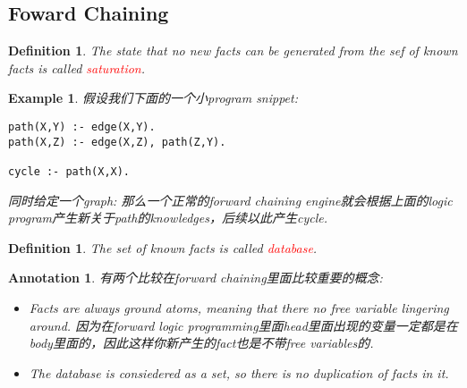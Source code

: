\documentclass{article}
\theoremstyle{plain}
\newtheorem{example}[theorem]{Example}
\newtheorem{definition}[theorem]{Definition}
\newtheorem{annotation}[theorem]{Annotation}
\theoremstyle{nonumberplain}
\newcommand{\redt}[1]{\textcolor{red}{#1}}
\begin{document}
\newpage
\subsection{Foward Chaining}

\begin{definition}
\rm The state that no new facts can be generated from the sef of known facts is called \redt{saturation}.
\end{definition}


\begin{example}
\rm 假设我们下面的一个小program snippet:
\begin{lstlisting}[basicstyle={\normalsize\ttfamily}]
path(X,Y) :- edge(X,Y). 
path(X,Z) :- edge(X,Z), path(Z,Y).

cycle :- path(X,X).
\end{lstlisting}
同时给定一个graph:  那么一个正常的forward chaining engine就会根据上面的logic program产生新关于path的knowledges，后续以此产生cycle. 
\end{example}

\begin{definition}
\rm The set of known facts is called \redt{database}.
\end{definition}

\begin{annotation}
\rm 有两个比较在forward chaining里面比较重要的概念:
\begin{itemize}
	\item Facts are always ground atoms, meaning that there no free variable lingering around. 因为在forward logic programming里面head里面出现的变量一定都是在body里面的，因此这样你新产生的fact也是不带free variables的. 
	\item The database is consiedered as a set, so there is no duplication of facts in it. 
\end{itemize}
\end{annotation}
\end{document}
